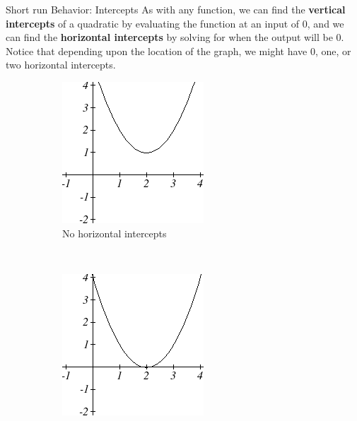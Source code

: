 Short run Behavior: Intercepts
As with any function, we can find the {\bf vertical intercepts} of a quadratic by evaluating the function at an input of 0, and we can find the {\bf horizontal intercepts} by solving for when the output will be 0. Notice that depending upon the location of the graph, we might have 0, one, or two horizontal intercepts.
\begin{figure}[!ht]
    \centering
    \begin{subfigure}[b]{0.3\textwidth}
        \includegraphics[width=\textwidth]{img/chap1/sec1-5/image058.png}
        \caption{No horizontal intercepts}
    \end{subfigure}
    ~
    \begin{subfigure}[b]{0.3\textwidth}
        \includegraphics[width=\textwidth]{img/chap1/sec1-5/image059.png}

\end{subfigure}
\end{figure}
